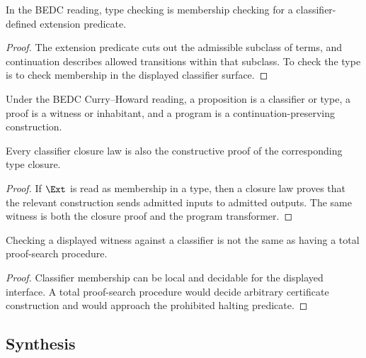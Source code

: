 \begin{theorem}
\label{thm:philosophy-type-checking-classifier-membership}
In the BEDC reading, type checking is membership checking for a
classifier-defined extension predicate.
\end{theorem}
\begin{proof}
The extension predicate cuts out the admissible subclass of terms, and
continuation describes allowed transitions within that subclass. To
check the type is to check membership in the displayed classifier
surface.
\end{proof}

\begin{definition}
\label{def:philosophy-curry-howard-reading}
Under the BEDC Curry--Howard reading, a proposition is a classifier or
type, a proof is a witness or inhabitant, and a program is a
continuation-preserving construction.
\end{definition}

\begin{theorem}
\label{thm:philosophy-closure-law-constructive-proof}
Every classifier closure law is also the constructive proof of the
corresponding type closure.
\end{theorem}
\begin{proof}
If \(\Ext\) is read as membership in a type, then a closure law proves
that the relevant construction sends admitted inputs to admitted
outputs. The same witness is both the closure proof and the program
transformer.
\end{proof}

\begin{corollary}
\label{cor:philosophy-proof-checking-not-proof-search}
Checking a displayed witness against a classifier is not the same as
having a total proof-search procedure.
\end{corollary}
\begin{proof}
Classifier membership can be local and decidable for the displayed
interface. A total proof-search procedure would decide arbitrary
certificate construction and would approach the prohibited halting
predicate.
\end{proof}

\subsection{Synthesis}
\label{subsec:philosophy-logic-meta-loop-synthesis}

